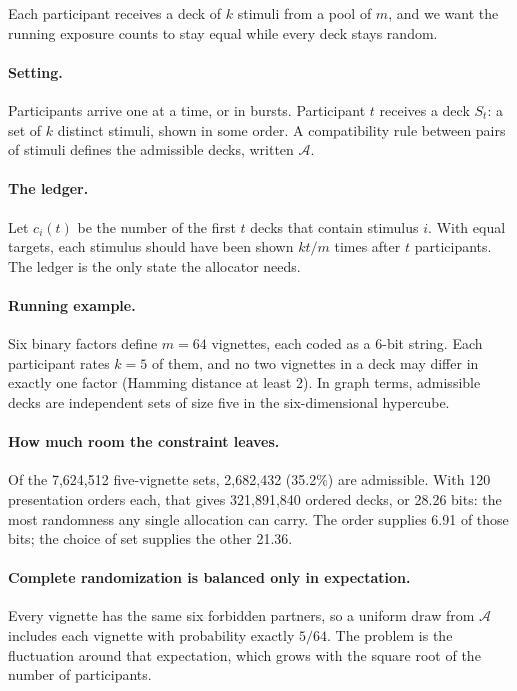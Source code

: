 \documentclass[11pt]{article}
\newcommand{\A}{\mathcal{A}}
\begin{document}
Each participant receives a deck of $k$ stimuli from a pool of $m$, and we want the running exposure counts to stay equal while every deck stays random.

\paragraph{Setting.} Participants arrive one at a time, or in bursts. Participant $t$ receives a deck $S_t$: a set of $k$ distinct stimuli, shown in some order. A compatibility rule between pairs of stimuli defines the admissible decks, written $\A$.

\paragraph{The ledger.} Let $c_i(t)$ be the number of the first $t$ decks that contain stimulus $i$. With equal targets, each stimulus should have been shown $kt/m$ times after $t$ participants. The ledger is the only state the allocator needs.

\paragraph{Running example.} Six binary factors define $m=64$ vignettes, each coded as a 6-bit string. Each participant rates $k=5$ of them, and no two vignettes in a deck may differ in exactly one factor (Hamming distance at least 2). In graph terms, admissible decks are independent sets of size five in the six-dimensional hypercube.

\paragraph{How much room the constraint leaves.} Of the 7,624,512 five-vignette sets, 2,682,432 (35.2\%) are admissible. With 120 presentation orders each, that gives 321,891,840 ordered decks, or 28.26 bits: the most randomness any single allocation can carry. The order supplies 6.91 of those bits; the choice of set supplies the other 21.36.

\paragraph{Complete randomization is balanced only in expectation.} Every vignette has the same six forbidden partners, so a uniform draw from $\A$ includes each vignette with probability exactly $5/64$. The problem is the fluctuation around that expectation, which grows with the square root of the number of participants.
\end{document}
